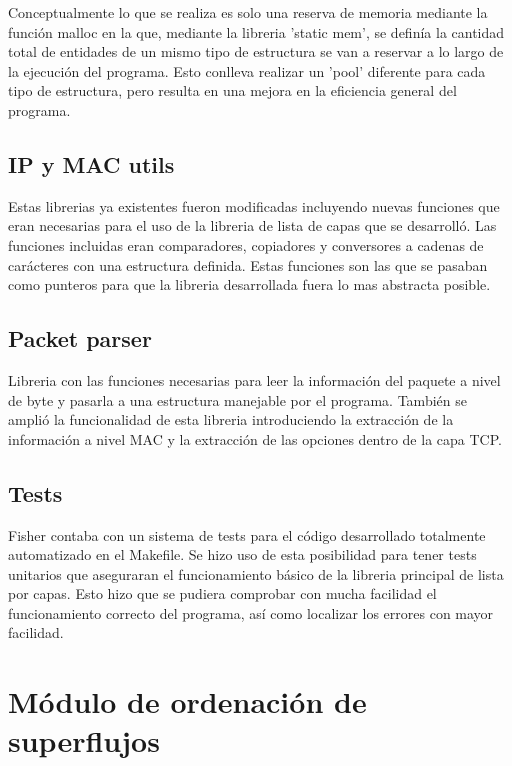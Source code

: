 \documentclass[twoside, 12pt]{epstfg}
\begin{document}
Conceptualmente lo que se realiza es solo una reserva de memoria mediante la función malloc en la que, mediante la libreria 'static mem', se definía la cantidad total de entidades de un mismo tipo de estructura se van a reservar a lo largo de la ejecución del programa. Esto conlleva realizar un 'pool' diferente para cada tipo de estructura, pero resulta en una mejora en la eficiencia general del programa. 
\subsection{IP y MAC utils}
Estas librerias ya existentes fueron modificadas incluyendo nuevas funciones que eran necesarias para el uso de la libreria de lista de capas que se desarrolló. Las funciones incluidas eran comparadores, copiadores y conversores a cadenas de carácteres con una estructura definida. Estas funciones son las que se pasaban como punteros para que la libreria desarrollada fuera lo mas abstracta posible.
\subsection{Packet parser}
Libreria con las funciones necesarias para leer la información del paquete a nivel de byte y pasarla a una estructura manejable por el programa. También se amplió la funcionalidad de esta libreria introduciendo la extracción de la información a nivel MAC y la extracción de las opciones dentro de la capa TCP.
\subsection{Tests}
Fisher contaba con un sistema de tests para el código desarrollado totalmente automatizado en el Makefile. Se hizo uso de esta posibilidad para tener tests unitarios que aseguraran el funcionamiento básico de la libreria principal de lista por capas. Esto hizo que se pudiera comprobar con mucha facilidad el funcionamiento correcto del programa, así como localizar los errores con mayor facilidad.


\section{Módulo de ordenación de superflujos}
\end{document}
